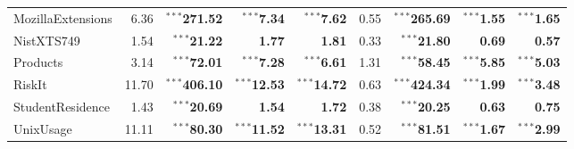 \documentclass{article}
\newcommand{\schemaForTable}[1]{#1\xspace}
\newcommand{\MozillaExtensionsForTable}{\schemaForTable{MozillaExtensions}}
\newcommand{\NistXTSNineForTable}{\schemaForTable{NistXTS749}}
\newcommand{\ProductsForTable}{\schemaForTable{Products}}
\newcommand{\RiskItForTable}{\schemaForTable{RiskIt}}
\newcommand{\StudentResidenceForTable}{\schemaForTable{StudentResidence}}
\newcommand{\UnixUsageForTable}{\schemaForTable{UnixUsage}}
\begin{document}
\begin{table}[!ht]
\begin{center}
{\begin{tabular}{lrrrr|rrrr}
\MozillaExtensionsForTable&6.36&$^{\ast\ast\ast}$\textbf{271.52}&$^{\ast\ast\ast}$\textbf{7.34}&$^{\ast\ast\ast}$\textbf{7.62}&0.55&$^{\ast\ast\ast}$\textbf{265.69}&$^{\ast\ast\ast}$\textbf{1.55}&$^{\ast\ast\ast}$\textbf{1.65}\\
\NistXTSNineForTable&1.54&$^{\ast\ast\ast}$\textbf{21.22}&\textbf{1.77}&\textbf{1.81}&0.33&$^{\ast\ast\ast}$\textbf{21.80}&\textbf{0.69}&\textbf{0.57}\\
\ProductsForTable&3.14&$^{\ast\ast\ast}$\textbf{72.01}&$^{\ast\ast\ast}$\textbf{7.28}&$^{\ast\ast\ast}$\textbf{6.61}&1.31&$^{\ast\ast\ast}$\textbf{58.45}&$^{\ast\ast\ast}$\textbf{5.85}&$^{\ast\ast\ast}$\textbf{5.03}\\
\RiskItForTable&11.70&$^{\ast\ast\ast}$\textbf{406.10}&$^{\ast\ast\ast}$\textbf{12.53}&$^{\ast\ast\ast}$\textbf{14.72}&0.63&$^{\ast\ast\ast}$\textbf{424.34}&$^{\ast\ast\ast}$\textbf{1.99}&$^{\ast\ast\ast}$\textbf{3.48}\\
\StudentResidenceForTable&1.43&$^{\ast\ast\ast}$\textbf{20.69}&\textbf{1.54}&\textbf{1.72}&0.38&$^{\ast\ast\ast}$\textbf{20.25}&\textbf{0.63}&\textbf{0.75}\\
\UnixUsageForTable&11.11&$^{\ast\ast\ast}$\textbf{80.30}&$^{\ast\ast\ast}$\textbf{11.52}&$^{\ast\ast\ast}$\textbf{13.31}&0.52&$^{\ast\ast\ast}$\textbf{81.51}&$^{\ast\ast\ast}$\textbf{1.67}&$^{\ast\ast\ast}$\textbf{2.99}\\      \hline
      \end{tabular}
    }
  \end{center}
\end{table}
\end{document}
